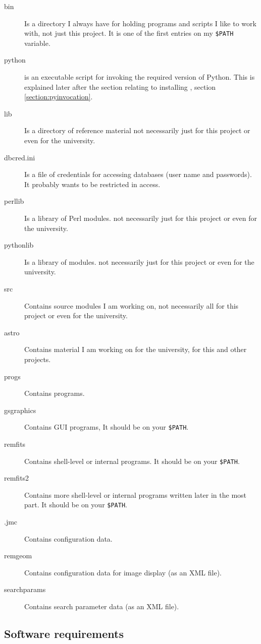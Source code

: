 \begin{description}
\item[bin] Is a directory I always have for holding programs and scripts I like
to work with, not just this project. It is one of the first entries on my
\texttt{\$PATH} variable.
\item[python] is an executable script for invoking the required version of
Python. This is explained later after the section relating to installing \anac,
section \ref{section:pyinvocation}.
\item[lib] Is a directory of reference material not necessarily just for this
project or even for the university.
\item[dbcred.ini] Is a file of credentials for accessing databases (user name
and passwords). It probably wants to be restricted in access.
\item[perllib] Is a library of Perl modules. not necessarily just for this
project or even for the university.
\item[pythonlib] Is a library of {\py} modules. not necessarily just for this
project or even for the university.
\item[src] Contains source modules I am working on, not necessarily all for
this project or even for the university.
\item[astro] Contains material I am working on for the university, for this and
other projects.
\item[progs] Contains programs.
\item[gsgraphics] Contains GUI programs, It should be on your \texttt{\$PATH}.
\item[remfits] Contains shell-level or internal programs. It should be on your
\texttt{\$PATH}.
\item[remfits2] Contains more shell-level or internal programs written later in
the most part. It should be on your \texttt{\$PATH}.
\item[.jmc] Contains configuration data.
\item[remgeom] Contains configuration data for image display (as an XML file).
\item[searchparams] Contains search parameter data (as an XML file).
\end{description}

\subsection{Software requirements}
\protect\label{section:softrequrements}

